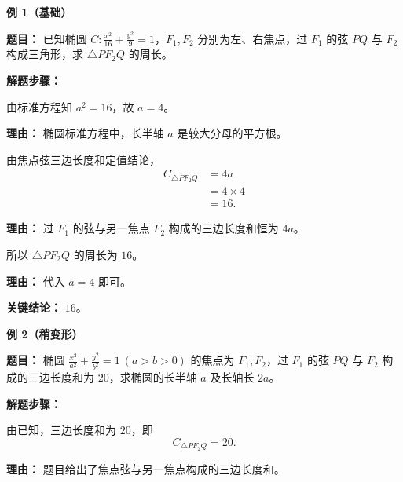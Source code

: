 \begin{examplebox}
	\textbf{\textcolor{CExample}{例 1（基础）}}

	\textbf{\textcolor{CExample}{题目：}} 已知椭圆 $C:\frac{x^2}{16}+\frac{y^2}{9}=1$，$F_1,F_2$ 分别为左、右焦点，过 $F_1$ 的弦 $PQ$ 与 $F_2$ 构成三角形，求 $\triangle PF_2Q$ 的周长。

	\textbf{\textcolor{CExample}{解题步骤：}}
	\begin{description}[style=nextline, leftmargin=2.8em, labelsep=0.5em, itemsep=0.45em]
		\item[\textbf{第一步（确定长半轴）：}]
		      由标准方程知 $a^2=16$，故 $a=4$。
		      \par\textbf{理由：} 椭圆标准方程中，长半轴 $a$ 是较大分母的平方根。

		\item[\textbf{第二步（套用结论）：}]
		      由焦点弦三边长度和定值结论，
		      \[
			      \begin{aligned}
				      C_{\triangle PF_2Q} & = 4a         \\
				                          & = 4 \times 4 \\
				                          & = 16.
			      \end{aligned}
		      \]
		      \par\textbf{理由：} 过 $F_1$ 的弦与另一焦点 $F_2$ 构成的三边长度和恒为 $4a$。

		\item[\textbf{第三步（得出答案）：}]
		      所以 $\triangle PF_2Q$ 的周长为 $16$。
		      \par\textbf{理由：} 代入 $a=4$ 即可。
	\end{description}

	\textbf{\textcolor{CExample}{关键结论：}} \textbf{$16$}。

	\medskip
	\textbf{\textcolor{CExample}{例 2（稍变形）}}

	\textbf{\textcolor{CExample}{题目：}} 椭圆 $\frac{x^2}{a^2}+\frac{y^2}{b^2}=1\ (a>b>0)$ 的焦点为 $F_1,F_2$，过 $F_1$ 的弦 $PQ$ 与 $F_2$ 构成的三边长度和为 $20$，求椭圆的长半轴 $a$ 及长轴长 $2a$。

	\textbf{\textcolor{CExample}{解题步骤：}}
	\begin{description}[style=nextline, leftmargin=2.8em, labelsep=0.5em, itemsep=0.45em]
		\item[\textbf{第一步（列出等式）：}]
		      由已知，三边长度和为 $20$，即
		      \[
			      C_{\triangle PF_2Q}=20.
		      \]
		      \par\textbf{理由：} 题目给出了焦点弦与另一焦点构成的三边长度和。


\end{description}
\end{examplebox}
